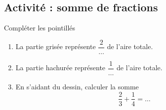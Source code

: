 
\subsection*{Activité : somme de fractions}

Compléter les pointillés
\begin{center}
   
\end{center}
\begin{enumerate}
    \item
        La partie grisée représente \( \dfrac{ 2 }{ \ldots }\) de l'aire totale.
    \item
        La partie hachurée représente \( \dfrac{ 1 }{ \ldots }\) de l'aire totale.
    \item
        En s'aidant du dessin, calculer la somme
        \begin{equation}
            \frac{ 2 }{ 3 }+\frac{1}{ 4 }=\ldots
        \end{equation}
\end{enumerate}
